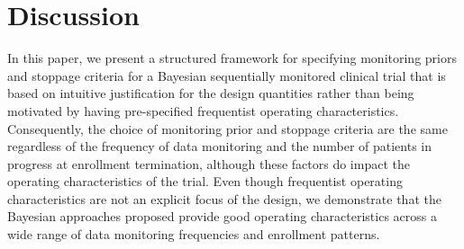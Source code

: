 \documentclass[useAMS,usenatbib,referee]{biom}
\begin{document}
\section{Discussion}
In this paper, we present a structured framework for specifying monitoring priors and stoppage criteria for a Bayesian sequentially monitored clinical trial that is based on intuitive justification for the design quantities rather than being motivated by having pre-specified frequentist operating characteristics.
%
%
%
%
%
Consequently, the choice of monitoring prior and stoppage criteria are the same regardless of the frequency of data monitoring and the number of patients in progress at enrollment termination, although these factors do impact the operating characteristics of the trial.
%
Even though frequentist operating characteristics are not an explicit focus of the design, we demonstrate that the Bayesian approaches proposed provide good operating characteristics across a wide range of data monitoring frequencies and enrollment patterns.
\end{document}
